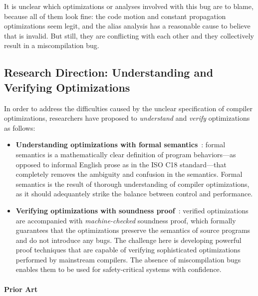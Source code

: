\noindent It is unclear which optimizations or analyses involved with this bug are to blame, because
all of them look fine: the code motion and constant propagation optimizations seem legit, and the
alias analysis has a reasonable cause to believe that  is invalid.  But still, they are
conflicting with each other and they collectively result in a miscompilation bug.



\subsection{Research Direction: Understanding and Verifying Optimizations}

In order to address the difficulties caused by the unclear specification of compiler optimizations,
researchers have proposed to \emph{understand} and \emph{verify} optimizations as follows:

\begin{itemize}
\item \textbf{Understanding optimizations with formal
    semantics}~\cite{norrish1998c,leroy:compcert,ellison2012executable}: formal semantics is a
  mathematically clear definition of program behaviors---as opposed to informal English prose as in
  the ISO C18 standard---that completely removes the ambiguity and confusion in the semantics.
  Formal semantics is the result of thorough understanding of compiler optimizations, as it should
  adequantely strike the balance between control and performance.

\item \textbf{Verifying optimizations with soundness proof}~\cite{compcert,vellvm}: verified
  optimizations are accompanied with \emph{machine-checked} soundness proof, which formally
  guarantees that the optimizations preserve the semantics of source programs and do not introduce
  any bugs.  The challenge here is developing powerful proof techniques that are capable of
  verifying sophisticated optimizations performed by mainstream compilers.  The absence of
  miscompilation bugs enables them to be used for safety-critical systems with confidence.
\end{itemize}


\paragraph{Prior Art}

